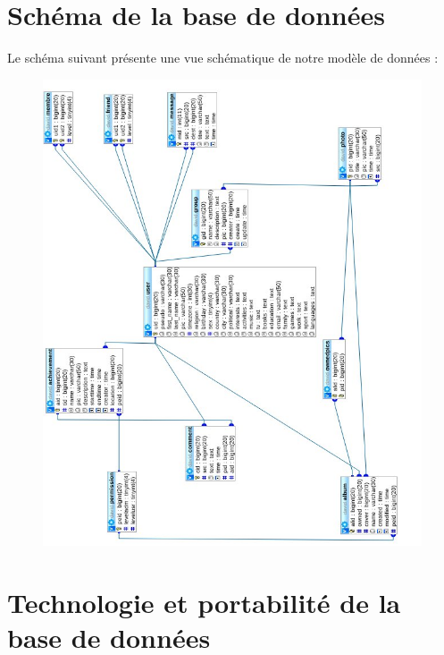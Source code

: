 \documentclass{life-fr}
\begin{document}
\newpage

\section{Schéma de la base de données}

Le schéma suivant présente une vue schématique de notre modèle de données :

\begin{figure}[H]
  \begin{center}
    \includegraphics[width=18cm]{img/imgdb.jpg}
  \end{center}
\end{figure}

\section{Technologie et portabilité de la base de données}
\end{document}
